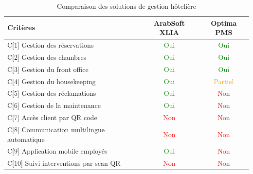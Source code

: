 \begin{table}[H]
\centering
\caption{Comparaison des solutions de gestion hôtelière}
\begin{tabularx}{\textwidth}{|X|c|c|}
\hline
\textbf{Critères} & \textbf{ArabSoft XLIA} & \textbf{Optima PMS} \\ \hline
C[1] Gestion des réservations & \textcolor{green}{Oui} & \textcolor{green}{Oui} \\ \hline
C[2] Gestion des chambres & \textcolor{green}{Oui} & \textcolor{green}{Oui} \\ \hline
C[3] Gestion du front office & \textcolor{green}{Oui} & \textcolor{green}{Oui} \\ \hline
C[4] Gestion du housekeeping & \textcolor{green}{Oui} & \textcolor{orange}{Partiel} \\ \hline
C[5] Gestion des réclamations & \textcolor{green}{Oui} & \textcolor{red}{Non} \\ \hline
C[6] Gestion de la maintenance & \textcolor{green}{Oui} & \textcolor{red}{Non} \\ \hline
C[7] Accès client par QR code & \textcolor{red}{Non} & \textcolor{red}{Non} \\ \hline
C[8] Communication multilingue automatique & \textcolor{red}{Non} & \textcolor{red}{Non} \\ \hline
C[9] Application mobile employés & \textcolor{green}{Oui} & \textcolor{red}{Non} \\ \hline
C[10] Suivi interventions par scan QR & \textcolor{red}{Non} & \textcolor{red}{Non} \\ \hline
\end{tabularx}
\label{tab:comparatif_hotellerie}
\end{table}
\FloatBarrier

